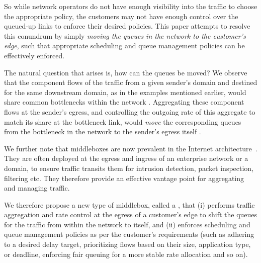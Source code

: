 So while network operators do not have enough visibility into the traffic to choose the appropriate policy, the customers may not have enough control over the queued-up links to enforce their desired policies. This paper attempts to resolve this conundrum by simply \emph{moving the queues in the network to the customer's edge}, such that appropriate scheduling and queue management policies can be effectively enforced.

The natural question that arises is, how can the queues be moved? We observe that the component flows of the traffic from a given sender's domain and destined for the same downstream domain, as in the examples mentioned earlier, would share common bottlenecks within the network . Aggregating these component flows at the sender's egress, and controlling the outgoing rate of this aggregate to match its share at the bottleneck link, would \emph{move} the corresponding queues from the bottleneck in the network to the sender's egress itself . 

We further note that middleboxes are now prevalent in the Internet architecture~\cite{aplomb}. They are often deployed at the egress and ingress of an enterprise network or a domain, to ensure traffic transits them for intrusion detection, packet inspection, filtering etc. They therefore provide an effective vantage point for aggregating and managing traffic. 

We therefore propose a new type of middlebox, called a \name, that (i) performs traffic aggregation and rate control at the egress of a customer's edge to shift the queues for the traffic from within the network to itself, and (ii) enforces scheduling and queue management policies as per the customer's requirements (such as adhering to a desired delay target, prioritizing flows based on their size, application type, or deadline, enforcing fair queuing for a more stable rate allocation and so on). 



